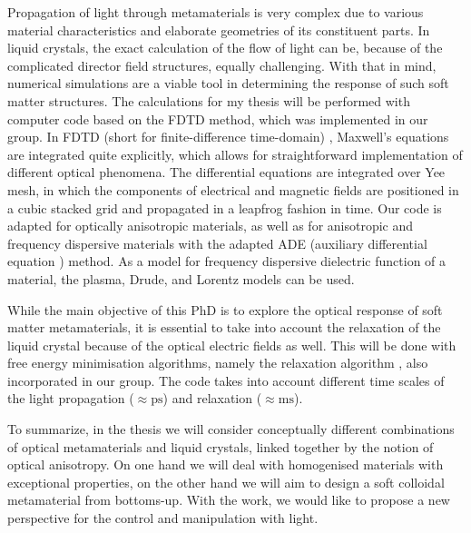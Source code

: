 \documentclass[a4paper,11pt]{article}
\begin{document}
Propagation of light through metamaterials is very complex due to various material characteristics and elaborate geometries of its constituent parts. 
In liquid crystals, the exact calculation of the flow of light can be, because of the complicated director field structures, equally challenging.
With that in mind, numerical simulations are a viable tool in determining the response of such soft matter structures. 
The calculations for my thesis will be performed with computer code based on the FDTD method, which was implemented in our group.
In FDTD (short for finite-difference time-domain) \cite{taflove1}, Maxwell's equations are integrated quite explicitly, which allows for straightforward implementation of different optical phenomena.
The differential equations are integrated over Yee mesh, in which the components of electrical and magnetic fields are positioned in a cubic stacked grid and propagated in a leapfrog fashion in time. 
Our code is adapted for optically anisotropic materials, as well as for anisotropic and frequency dispersive materials with the adapted ADE (auxiliary differential equation \cite{taflove1}) method. 
As a model for frequency dispersive dielectric function of a material, the plasma, Drude, and Lorentz models can be used. 

While the main objective of this PhD is to explore the optical response of soft matter metamaterials, it is essential to take into account the relaxation of the liquid crystal because of the optical electric fields as well. 
This will be done with free energy minimisation algorithms, namely the relaxation algorithm \cite{ravnik-2009-lc-modelling}, also incorporated in our group. 
The code takes into account different time scales of the light propagation ($\approx \mathrm{ps}$) and relaxation ($\approx \mathrm{ms}$). 

To summarize, in the thesis we will consider conceptually different combinations of optical metamaterials and liquid crystals, linked together by the notion of optical anisotropy. 
On one hand we will deal with homogenised materials with exceptional properties, on the other hand we will aim to design a soft colloidal metamaterial from bottoms-up. 
With the work, we would like to propose a new perspective for the control and manipulation with light. 
\end{document}
